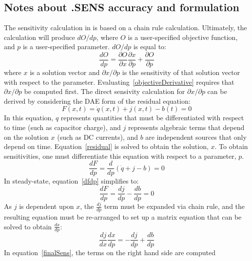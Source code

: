 \clearpage
\subsection{Notes about .SENS accuracy and formulation}
The sensitivity calculation in \Xyce{} is based on a chain rule calculation.   Ultimately,
the calculation will produce $dO/dp$, where $O$ is a user-specified objective function,
and $p$ is a user-specified parameter.  $dO/dp$ is equal to:
\begin{equation}
  \frac{dO}{dp} = \frac{\partial O}{\partial x}\frac{\partial x}{\partial p} + \frac{\partial O}{\partial p}
  \label{objectiveDerivative}
\end{equation}
\noindent where $x$ is a solution vector and $\partial x/\partial p$ is the sensitivity of that 
solution vector with respect to the parameter.  Evaluating~\ref{objectiveDerivative}
requires that $\partial x/\partial p$ be computed first.  The direct sensivity calculation for $\partial x/\partial p$ 
can be derived by considering the DAE form of the residual equation:
\begin{equation}
  F(x,t) = \dot{q}(x,t) + j(x,t) - b(t) = 0
  \label{residual}
\end{equation}
\noindent In this equation, $q$ represents quantities that must be differentiated 
with respect to time (such as capacitor charge), and $j$ represents algebraic 
terms that depend on the solution $x$ (such as DC currents), and $b$ are independent sources that 
only depend on time.  Equation~\ref{residual} is solved to obtain the solution, $x$.
To obtain sensitivities, one must differentiate this equation with respect to a 
parameter, $p$.
\begin{equation}
  \frac{dF}{dp} = \frac{d}{dp}\left( \dot{q} + j - b \right) = 0
  \label{dfdp}
\end{equation}
In steady-state, equation~\ref{dfdp} simplifies to:
\begin{equation}
  \frac{dF}{dp} = \frac{dj}{dp} - \frac{db}{dp} = 0
  \label{steady_dfdp}
\end{equation}
\noindent As $j$ is dependent upon $x$, the $\frac{dj}{dp}$ term must be expanded via chain rule, and
the resulting equation must be re-arranged to set up 
a matrix equation that can be solved to obtain $\frac{dx}{dp}$:
\begin{equation}
  \frac{dj}{dx}\frac{dx}{dp} = - \frac{dj}{dp} + \frac{db}{dp} 
  \label{finalSens}
\end{equation}
\noindent In equation~\ref{finalSens}, the terms on the right hand side are computed 
